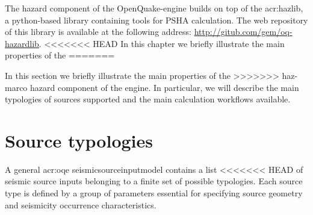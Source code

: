 The hazard component of the OpenQuake-engine builds on top of the 
\gls{acr:hazlib}, a python-based library containing
tools for PSHA calculation. 
%
The web repository of this library is available at the following address: 
\href{http://gitub.com/gem/oq-hazardlib}{http://gitub.com/gem/oq-hazardlib}.
<<<<<<< HEAD
%
In this chapter we briefly illustrate the main properties of the 
=======

In this section we briefly illustrate the main properties of the 
>>>>>>> haz-marco
hazard component of the engine. 
%
In particular, we will describe the main typologies of sources supported 
and the main calculation workflows available.
%
\section{Source typologies}
A general \gls{acr:oqe} \gls{seismicsourceinputmodel} contains a list
<<<<<<< HEAD
of seismic source inputs belonging to a finite set of possible 
typologies. Each source type is defined by a group of parameters 
essential for specifying source geometry and seismicity occurrence 
characteristics.
 
